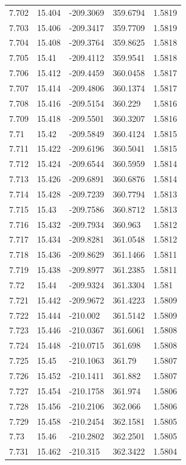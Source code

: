 \begin{tabular}{lllll}
7.702 & 15.404 & -209.3069 & 359.6794 & 1.5819 \\
7.703 & 15.406 & -209.3417 & 359.7709 & 1.5819 \\
7.704 & 15.408 & -209.3764 & 359.8625 & 1.5818 \\
7.705 & 15.41 & -209.4112 & 359.9541 & 1.5818 \\
7.706 & 15.412 & -209.4459 & 360.0458 & 1.5817 \\
7.707 & 15.414 & -209.4806 & 360.1374 & 1.5817 \\
7.708 & 15.416 & -209.5154 & 360.229 & 1.5816 \\
7.709 & 15.418 & -209.5501 & 360.3207 & 1.5816 \\
7.71 & 15.42 & -209.5849 & 360.4124 & 1.5815 \\
7.711 & 15.422 & -209.6196 & 360.5041 & 1.5815 \\
7.712 & 15.424 & -209.6544 & 360.5959 & 1.5814 \\
7.713 & 15.426 & -209.6891 & 360.6876 & 1.5814 \\
7.714 & 15.428 & -209.7239 & 360.7794 & 1.5813 \\
7.715 & 15.43 & -209.7586 & 360.8712 & 1.5813 \\
7.716 & 15.432 & -209.7934 & 360.963 & 1.5812 \\
7.717 & 15.434 & -209.8281 & 361.0548 & 1.5812 \\
7.718 & 15.436 & -209.8629 & 361.1466 & 1.5811 \\
7.719 & 15.438 & -209.8977 & 361.2385 & 1.5811 \\
7.72 & 15.44 & -209.9324 & 361.3304 & 1.581 \\
7.721 & 15.442 & -209.9672 & 361.4223 & 1.5809 \\
7.722 & 15.444 & -210.002 & 361.5142 & 1.5809 \\
7.723 & 15.446 & -210.0367 & 361.6061 & 1.5808 \\
7.724 & 15.448 & -210.0715 & 361.698 & 1.5808 \\
7.725 & 15.45 & -210.1063 & 361.79 & 1.5807 \\
7.726 & 15.452 & -210.1411 & 361.882 & 1.5807 \\
7.727 & 15.454 & -210.1758 & 361.974 & 1.5806 \\
7.728 & 15.456 & -210.2106 & 362.066 & 1.5806 \\
7.729 & 15.458 & -210.2454 & 362.1581 & 1.5805 \\
7.73 & 15.46 & -210.2802 & 362.2501 & 1.5805 \\
7.731 & 15.462 & -210.315 & 362.3422 & 1.5804 \\

\end{tabular}
